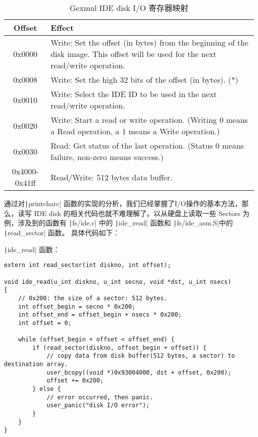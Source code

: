 \begin{table}[htbp]
\caption{Gexmul IDE disk I/O 寄存器映射}\label{lab5-table-disk-mem-map}
\centering
\begin{tabular}{|c|p{12cm}|}
  \hline
    Offset & Effect \\
  \hline
    0x0000 & Write: Set the offset (in bytes) from the beginning of the disk image. This offset will be used for the next read/write operation. \\
  \hline
    0x0008 & Write: Set the high 32 bits of the offset (in bytes). (*) \\
  \hline
    0x0010 & Write: Select the IDE ID to be used in the next read/write operation. \\
  \hline
    0x0020 & Write: Start a read or write operation. (Writing 0 means a Read operation, a 1 means a Write operation.) \\
  \hline
    0x0030 & Read: Get status of the last operation. (Status 0 means failure, non-zero means success.) \\
  \hline
    0x4000-0x41ff  &  Read/Write: 512 bytes data buffer. \\
  \hline
\end{tabular}
\end{table}

通过对\texttt|printcharc| 函数的实现的分析，我们已经掌握了I/O操作的基本方法，那么，读写 IDE disk 
的相关代码也就不难理解了。以从硬盘上读取一些 Sectors 为例，涉及到的函数有 \texttt|fs/ide.c| 中的 
\texttt|ide_read| 函数和 \texttt|fs/ide_asm.S|中的 \texttt|read_sector| 函数。
具体代码如下：

\texttt|ide_read| 函数：

\begin{verbatim}
extern int read_sector(int diskno, int offset);

void ide_read(u_int diskno, u_int secno, void *dst, u_int nsecs)
{
    // 0x200: the size of a sector: 512 bytes.
    int offset_begin = secno * 0x200;
    int offset_end = offset_begin + nsecs * 0x200;
    int offset = 0;

    while (offset_begin + offset < offset_end) {
        if (read_sector(diskno, offset_begin + offset)) {
            // copy data from disk buffer(512 bytes, a sector) to destination array.
            user_bcopy((void *)0x93004000, dst + offset, 0x200);
            offset += 0x200;
        } else {
            // error occurred, then panic.
            user_panic("disk I/O error");
        }
    }
}
\end{verbatim}

